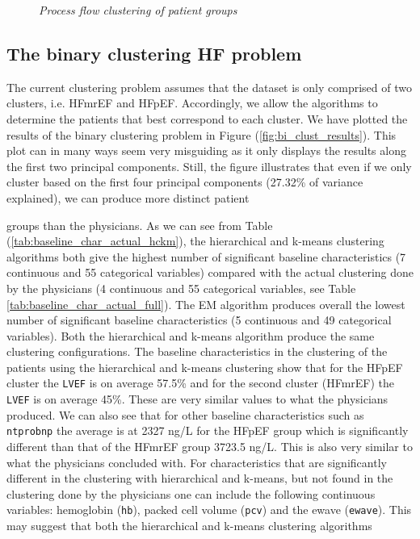 \documentclass[../thesis.tex]{subfiles}
\begin{document}
\begin{figure}
    \centering
    
    \caption[Process flow clustering of patient groups]{\textit{Process flow clustering of patient groups}}
    \label{fig:process_flow_clustering}
\end{figure}

\subsection{The binary clustering HF problem}
\label{subsec:bi_clust}

The current clustering problem assumes that the dataset is only comprised of two clusters, i.e. HFmrEF and HFpEF. Accordingly, we allow the algorithms to determine the patients that best correspond to each cluster. We have plotted the results of the binary clustering problem in Figure (\ref{fig:bi_clust_results}). This plot can in many ways seem very misguiding as it only displays the results along the first two principal components. Still, the figure illustrates that even if we only cluster based on the first four principal components (27.32\% of variance explained), we can produce more distinct patient     





\noindent groups than the physicians. As we can see from Table (\ref{tab:baseline_char_actual_hckm}), the hierarchical and k-means clustering algorithms both give the highest number of significant baseline characteristics (7 continuous and 55 categorical variables) compared with the actual clustering done by the physicians (4 continuous and 55 categorical variables, see Table \ref{tab:baseline_char_actual_full}). The EM algorithm produces overall the lowest number of significant baseline characteristics (5 continuous and 49 categorical variables). Both the hierarchical and k-means algorithm produce the same clustering configurations. The baseline characteristics in the clustering of the patients using the hierarchical and k-means clustering show that for the HFpEF cluster the \texttt{LVEF} is on average 57.5\% and for the second cluster (HFmrEF) the \texttt{LVEF} is on average 45\%. These are very similar values to what the physicians produced. We can also see that for other baseline characteristics such as \texttt{ntprobnp} the average is at 2327 ng/L for the HFpEF group which is significantly different than that of the HFmrEF group 3723.5 ng/L. This is also very similar to what the physicians concluded with. For characteristics that are significantly different in the clustering with hierarchical and k-means, but not found in the clustering done by the physicians one can include the following continuous variables: hemoglobin (\texttt{hb}), packed cell volume (\texttt{pcv}) and the ewave (\texttt{ewave}). This may suggest that both the hierarchical and k-means clustering algorithms    
\end{document}
